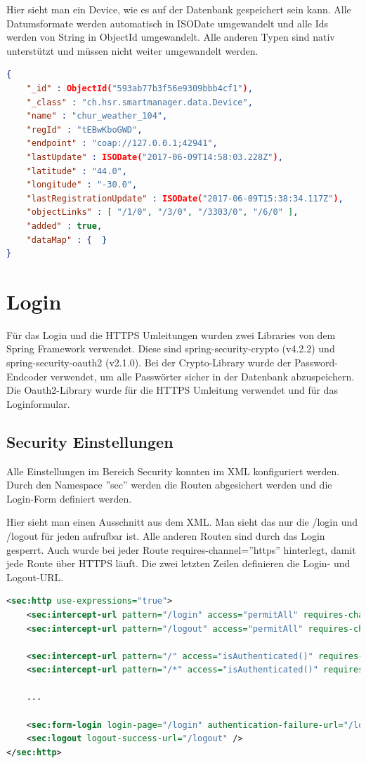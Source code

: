 Hier sieht man ein Device, wie es auf der Datenbank gespeichert sein kann. Alle Datumsformate werden automatisch in ISODate umgewandelt und alle Ids werden von String in ObjectId umgewandelt. Alle anderen Typen sind nativ unterstützt und müssen nicht weiter umgewandelt werden.
\begin{lstlisting}[language=json]
{ 
	"_id" : ObjectId("593ab77b3f56e9309bbb4cf1"), 
	"_class" : "ch.hsr.smartmanager.data.Device", 
	"name" : "chur_weather_104", 
	"regId" : "tEBwKboGWD", 
	"endpoint" : "coap://127.0.0.1;42941", 
	"lastUpdate" : ISODate("2017-06-09T14:58:03.228Z"), 
	"latitude" : "44.0", 
	"longitude" : "-30.0", 
	"lastRegistrationUpdate" : ISODate("2017-06-09T15:38:34.117Z"),
	"objectLinks" : [ "/1/0", "/3/0", "/3303/0", "/6/0" ], 
	"added" : true, 
	"dataMap" : {  } 
}
\end{lstlisting}

\newpage

\section{Login}
Für das Login und die HTTPS Umleitungen wurden zwei Libraries von dem Spring Framework verwendet.
Diese sind spring-security-crypto (v4.2.2) und spring-security-oauth2 (v2.1.0). Bei der Crypto-Library wurde der Password-Endcoder verwendet, um alle Passwörter sicher in der Datenbank abzuspeichern. Die Oauth2-Library wurde für die HTTPS Umleitung verwendet und für das Loginformular.

\subsection{Security Einstellungen}
Alle Einstellungen im Bereich Security konnten im XML konfiguriert werden. Durch den Namespace ''sec'' werden die Routen abgesichert werden und die Login-Form definiert werden.

Hier sieht man einen Ausschnitt aus dem XML. Man sieht das nur die /login und /logout für jeden aufrufbar ist. Alle anderen Routen sind durch das Login gesperrt. Auch wurde bei jeder Route requires-channel=''https'' hinterlegt, damit jede Route über HTTPS läuft. Die zwei letzten Zeilen definieren die Login- und Logout-URL.
\begin{lstlisting}[language=xml]
<sec:http use-expressions="true">
	<sec:intercept-url pattern="/login" access="permitAll" requires-channel="https"/>
	<sec:intercept-url pattern="/logout" access="permitAll" requires-channel="https"/>
	
	<sec:intercept-url pattern="/" access="isAuthenticated()" requires-channel="https" />
	<sec:intercept-url pattern="/*" access="isAuthenticated()" requires-channel="https" />
	
	...
		
	<sec:form-login login-page="/login" authentication-failure-url="/login?error=true" />
	<sec:logout logout-success-url="/logout" />
</sec:http>
\end{lstlisting}

